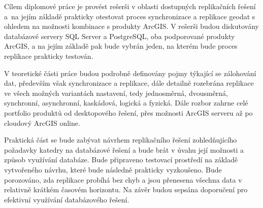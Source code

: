 Cílem diplomové práce je provést rešerši v oblasti dostupných replikačních řešení a~na jejím základě prakticky otestovat proces synchronizace a replikace geodat s ohledem na možnosti kombinace s produkty ArcGIS. V rešerši budou diskutovány databázové servery SQL Server a PostgreSQL, oba podporované produkty ArcGIS, a na jejím základě pak bude vybrán jeden, na kterém bude proces replikace prakticky testován.

V teoretické části práce budou podrobně definovány pojmy týkající se zálohování dat, především však synchronizace a replikace, dále detailně rozebrána replikace ve všech možných variantách nastavení, tedy jednosměrná, dvousměrná, synchronní, asynchronní, kaskádová, logická a fyzická. Dále rozbor zahrne celé portfolio produktů od desktopového řešení, přes možnosti ArcGIS serveru až po cloudový ArcGIS online.

Praktická část se bude zabývat návrhem replikačního řešení zohledňujícího požadavky katedry na databázové řešení a bude brát v úvahu její možnosti a způsob využívání databáze. Bude připraveno testovací prostředí na základě vytvořeného návrhu, které bude následně prakticky vyzkoušeno. Bude porozováno, zda replikace probíhá bez chyb a jsou přenesena všechna data v relativně krátkém časovém horizontu. Na závěr budou sepsána doporučení pro efektivní využívání databázového řešení.

